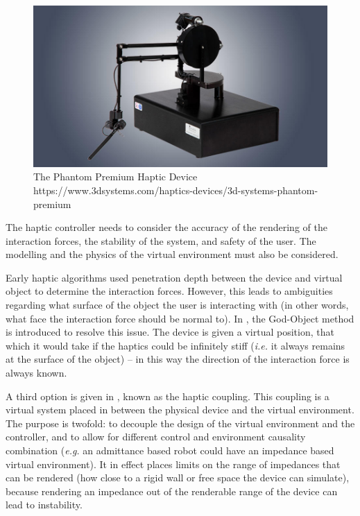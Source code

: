 \documentclass[12pt]{report}
\begin{document}
	\begin{figure}[t] 
		\centering
		\includegraphics[width=0.6\linewidth]{phantom}
		\caption{The Phantom Premium Haptic Device https://www.3dsystems.com/haptics-devices/3d-systems-phantom-premium}
		\label{fig:phantom}
	\end{figure}		
	
	
		
	The haptic controller needs to consider the accuracy of the rendering of the interaction forces, the stability of the system, and safety of the user. The modelling and the physics of the virtual environment must also be considered. 		
		
		Early haptic algorithms used penetration depth between the device and virtual object to determine the interaction forces. However, this leads to ambiguities regarding what surface of the object the user is interacting with (in other words, what face the interaction force should be normal to). In \cite{Zilles}, the God-Object method is introduced to resolve this issue. The device is given a virtual position, that which it would take if the haptics could be infinitely stiff (\textit{i.e.} it always remains at the surface of the object) -- in this way the direction of the interaction force is always known. 
		
	A third option is given in \cite{Adams1999}, known as the haptic coupling. This coupling is a virtual system placed in between the physical device and the virtual environment. The purpose is twofold: to decouple the design of the virtual environment and the controller, and to allow for different control and environment causality combination (\textit{e.g.} an admittance based robot could have an impedance based virtual environment). It in effect places limits on the range of impedances that can be rendered (how close to a rigid wall or free space the device can simulate), because rendering an impedance out of the renderable range of the device can lead to instability. 
	
\end{document}
